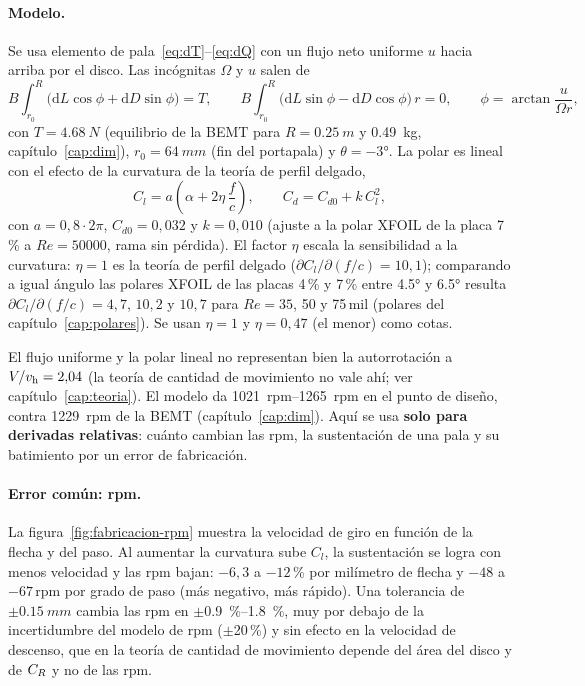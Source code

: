 \paragraph{Modelo.} Se usa elemento de pala~\eqref{eq:dT}--\eqref{eq:dQ} con un flujo
neto uniforme $u$ hacia arriba por el disco. Las incógnitas $\Omega$ y $u$ salen de
\begin{equation}
  B\!\int_{r_0}^{R}\!\big(\mathrm dL\cos\phi+\mathrm dD\sin\phi\big)=T,\qquad
  B\!\int_{r_0}^{R}\!\big(\mathrm dL\sin\phi-\mathrm dD\cos\phi\big)\,r=0,\qquad
  \phi=\arctan\frac{u}{\Omega r},
  \label{eq:fabricacion-autorrot}
\end{equation}
con $T=\SI{4.68}{N}$ (equilibrio de la BEMT para $R=\SI{0.25}{m}$ y \SI{0.49}{kg}, capítulo~\ref{cap:dim}),
$r_0=\SI{64}{mm}$ (fin del portapala) y $\theta=\ang{-3}$. La polar
es lineal con el efecto de la curvatura de la teoría de perfil delgado,
\begin{equation}
  C_l = a\left(\alpha + 2\eta\,\frac{f}{c}\right),\qquad C_d = C_{d0} + k\,C_l^2,
  \label{eq:fabricacion-polar}
\end{equation}
con $a=0{,}8\cdot2\pi$, $C_{d0}=0{,}032$ y $k=0{,}010$ (ajuste a la polar XFOIL de la
placa 7\,\% a $Re=\num{50000}$, rama sin pérdida). El factor $\eta$ escala la
sensibilidad a la curvatura: $\eta=1$ es la teoría de perfil delgado
($\partial C_l/\partial(f/c)=10{,}1$); comparando a igual ángulo las polares XFOIL de las
placas 4\,\% y 7\,\% entre \ang{4.5} y \ang{6.5} resulta $\partial C_l/\partial(f/c)=4{,}7$,
$10{,}2$ y $10{,}7$ para $Re=35$, 50 y \num{75}\,mil (polares del
capítulo~\ref{cap:polares}). Se usan $\eta=1$ y $\eta=0{,}47$ (el menor) como cotas.

\begin{nota}
El flujo uniforme y la polar lineal no representan bien la autorrotación a
$V/v_{\mathrm{h}}=2{,}04$ (la teoría de cantidad de movimiento no vale ahí; ver
capítulo~\ref{cap:teoria}). El modelo da \SIrange{1021}{1265}{rpm} en el punto de diseño,
contra \num{1229}~rpm de la BEMT (capítulo~\ref{cap:dim}). Aquí se usa \textbf{solo para
derivadas relativas}: cuánto cambian las rpm, la sustentación de una pala y su
batimiento por un error de fabricación.
\end{nota}

\paragraph{Error común: rpm.} La figura~\ref{fig:fabricacion-rpm} muestra la velocidad de
giro en función de la flecha y del paso. Al aumentar la curvatura sube $C_l$, la
sustentación se logra con menos velocidad y las rpm bajan: $-6{,}3$ a $-12$\,\% por
milímetro de flecha y $-48$ a $-67$\,rpm por grado de paso (más negativo, más rápido).
Una tolerancia de $\pm\SI{0.15}{mm}$ cambia las rpm en $\pm$\SIrange{0.9}{1.8}{\percent},
muy por debajo de la incertidumbre del modelo de rpm ($\pm$20\,\%) y sin efecto en la
velocidad de descenso, que en la teoría de cantidad de movimiento depende del área del
disco y de $C_{R}$ y no de las rpm.

